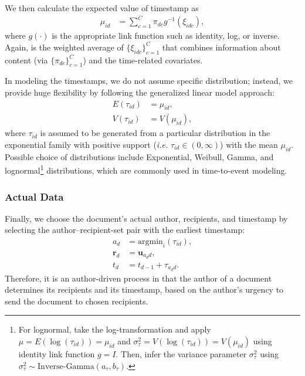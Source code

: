 \documentclass[twoside]{article}
\begin{document}
We then calculate the expected value of timestamp as
\begin{align*}\mu_{id} &= \sum_{c=1}^C \pi_{dc} g^{-1}(\xi_{idc}),
\end{align*}
where $g(\cdot)$ is the appropriate link function such as identity, log, or inverse. Again, is the weighted average of $\{\xi_{idc}\}_{c=1}^C$ that combines information about content (via $\{\pi_{dc}\}_{c=1}^C$) and the time-related covariates.

In modeling the timestamps, we do not assume specific distribution; instead, we provide huge flexibility by following the generalized linear model approach:
\begin{align*}
E(\tau_{id}) &= \mu_{id},\\
V(\tau_{id}) &= V(\mu_{id}),
\end{align*}
where $\tau_{id}$ is assumed to be generated from a particular distribution in the exponential family with positive support (\textit{i.e.} $\tau_{id} \in (0, \infty)$) with the mean $\mu_{id}$. Possible choice of distributions include Exponential, Weibull, Gamma, and lognormal\footnote{For lognormal, take the log-transformation and apply $\mu = E(\log(\tau_{id})) = \mu_{id}$ and $ \sigma_\tau^2=V(\log(\tau_{id})) = V(\mu_{id})$ using identity link function $g = I$. Then, infer the variance parameter $\sigma_\tau^2$ using $\sigma_\tau^2 \sim \mbox{Inverse-Gamma}(a_\tau, b_\tau)$.} distributions, which are commonly used in time-to-event modeling.

\subsubsection{Actual Data}\label{subsubsec:Actual Data}
Finally, we choose the document's actual author, recipients, and timestamp by selecting the author--recipient-set pair with the earliest timestamp:
\begin{align*}
a_d &= \mbox{argmin}_{i}(\tau_{id}),\\
\boldsymbol{r}_d &= \boldsymbol{u}_{a_d d},\\
t_d &=t_{d-1} + \tau_{a_d d}.
\end{align*}
Therefore, it is an author-driven process in that the author of a document determines its recipients and its timestamp, based on the author's urgency to send the document to chosen recipients. 
\end{document}

